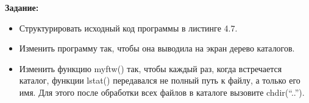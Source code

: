 \Introduction

\textbf{Задание:}
\begin{itemize}
    \item Структурировать исходный код программы в листинге 4.7.
    \item Изменить программу так, чтобы она выводила на экран дерево каталогов.
    \item Изменить функцию myftw() так, чтобы каждый раз, когда встречается каталог,
        функции lstat() передавался не полный путь к файлу, а только его имя. Для этого
        после обработки всех файлов в каталоге вызовите chdir(“..”).
\end{itemize}
